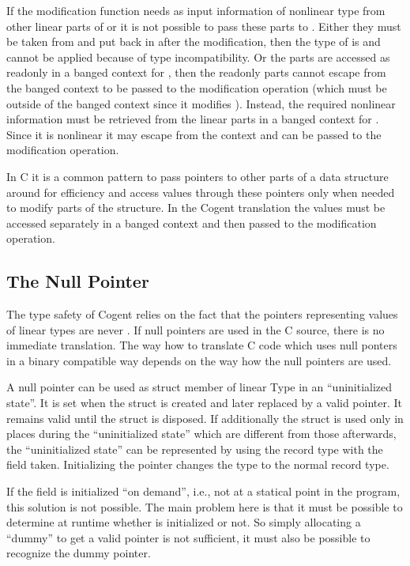 If the modification function  needs as input information of nonlinear type from other linear parts of  or  it is not
possible to pass these parts to . Either they must be taken from  and put back in after the modification, then
the type of  is  and  cannot be applied because of type incompatibility. Or the parts are
accessed as readonly in a banged context for , then the readonly parts cannot escape from the banged context to be passed to the
modification operation (which must be outside of the banged context since it modifies ). Instead, the required nonlinear information must 
be retrieved from the linear parts in a banged context for . Since it is nonlinear it may escape from the context and can be passed 
to the modification operation.

In C it is a common pattern to pass pointers to other parts of a data structure around for efficiency and access values through these pointers 
only when needed to modify parts of the structure. In the Cogent translation the values must be accessed separately in a banged context and then
passed to the modification operation.

\subsection{The Null Pointer}
\label{app-trans-null}

The type safety of Cogent relies on the fact that the pointers representing values of linear types are never .
If null pointers are used in the C source, there is no immediate translation. The way how to translate C code which uses 
null ponters in a binary compatible way depends on the way how the null pointers are used.

A null pointer can be used as struct member  of linear Type  in an ``uninitialized state''. 
It is set when the struct is created and later
replaced by a valid pointer. It remains valid until the struct is disposed. If additionally the struct is used only in places
during the ``uninitialized state'' which are different from those afterwards, the ``uninitialized state'' can be represented
by using the record type with the field  taken. Initializing the pointer changes the type to the normal record
type.

If the field  is initialized ``on demand'', i.e., not at a statical point in the program, this solution is not possible.
The main problem here is that it must be possible to determine at runtime whether  is initialized or not. So simply
allocating a ``dummy'' to get a valid pointer is not sufficient, it must also be possible to recognize the dummy pointer.


